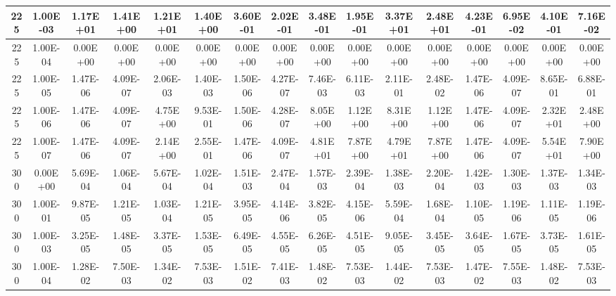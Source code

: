 \begin{table}[H]
\begin{center}
{\begin{tabular}{|c|c|c|c|c|c|c|c|c|c|c|c|c|c|c|c|}
225    &    1.00E-03    &    1.17E+01    &    1.41E+00    &    1.21E+01    &    1.40E+00    &    3.60E-01    &    2.02E-01    &    3.48E-01    &    1.95E-01    &    3.37E+01    &    2.48E+01    &    4.23E-01    &    6.95E-02    &    4.10E-01    &    7.16E-02    \\ \hline
225    &    1.00E-04    &    0.00E+00    &    0.00E+00    &    0.00E+00    &    0.00E+00    &    0.00E+00    &    0.00E+00    &    0.00E+00    &    0.00E+00    &    0.00E+00    &    0.00E+00    &    0.00E+00    &    0.00E+00    &    0.00E+00    &    0.00E+00    \\ \hline
225    &    1.00E-05    &    1.47E-06    &    4.09E-07    &    2.06E-03    &    1.40E-03    &    1.50E-06    &    4.27E-07    &    7.46E-03    &    6.11E-03    &    2.11E-01    &    2.48E-02    &    1.47E-06    &    4.09E-07    &    8.65E-01    &    6.88E-01    \\ \hline
225    &    1.00E-06    &    1.47E-06    &    4.09E-07    &    4.75E+00    &    9.53E-01    &    1.50E-06    &    4.28E-07    &    8.05E+00    &    1.12E+00    &    8.31E+00    &    1.12E+00    &    1.47E-06    &    4.09E-07    &    2.32E+01    &    2.48E+00    \\ \hline
225    &    1.00E-07    &    1.47E-06    &    4.09E-07    &    2.14E+00    &    2.55E-01    &    1.47E-06    &    4.09E-07    &    4.81E+01    &    7.87E+00    &    4.79E+01    &    7.87E+00    &    1.47E-06    &    4.09E-07    &    5.54E+01    &    7.90E+00    \\ \hline
300    &    0.00E+00    &    5.69E-04    &    1.06E-04    &    5.67E-04    &    1.02E-04    &    1.51E-03    &    2.47E-04    &    1.57E-03    &    2.39E-04    &    1.38E-03    &    2.20E-04    &    1.42E-03    &    1.30E-03    &    1.37E-03    &    1.34E-03    \\ \hline
300    &    1.00E-01    &    9.87E-05    &    1.21E-05    &    1.03E-04    &    1.21E-05    &    3.95E-05    &    4.14E-06    &    3.82E-05    &    4.15E-06    &    5.59E-04    &    1.68E-04    &    1.10E-05    &    1.19E-06    &    1.11E-05    &    1.19E-06    \\ \hline
300    &    1.00E-03    &    3.25E-05    &    1.48E-05    &    3.37E-05    &    1.53E-05    &    6.49E-05    &    4.55E-05    &    6.26E-05    &    4.51E-05    &    9.05E-05    &    3.45E-05    &    3.64E-05    &    1.67E-05    &    3.73E-05    &    1.61E-05    \\ \hline
300    &    1.00E-04    &    1.28E-02    &    7.50E-03    &    1.34E-02    &    7.53E-03    &    1.51E-02    &    7.41E-03    &    1.48E-02    &    7.53E-03    &    1.44E-02    &    7.53E-03    &    1.47E-02    &    7.55E-03    &    1.48E-02    &    7.53E-03    \\ \hline

\end{tabular}}
\end{center}
\end{table}
